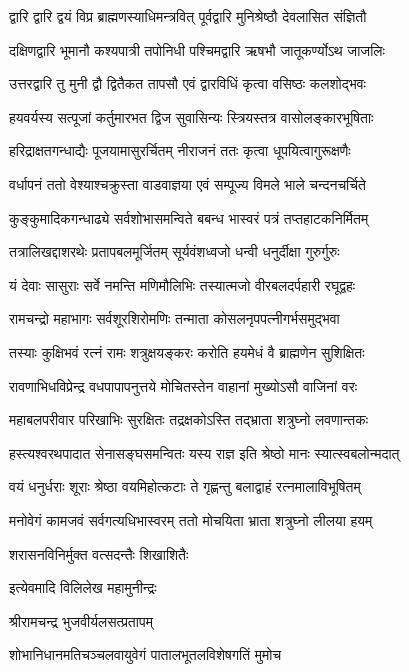 \twolineshloka
{द्वारि द्वारि द्वयं विप्र ब्राह्मणस्याधिमन्त्रवित्}
{पूर्वद्वारि मुनिश्रेष्ठौ देवलासित संज्ञितौ}%

\twolineshloka
{दक्षिणद्वारि भूमानौ कश्यपात्री तपोनिधी}
{पश्चिमद्वारि ऋषभौ जातूकर्ण्योऽथ जाजलिः}%

\twolineshloka
{उत्तरद्वारि तु मुनी द्वौ द्वितैकत तापसौ}
{एवं द्वारविधिं कृत्वा वसिष्ठः कलशोद्भवः}%

\twolineshloka
{हयवर्यस्य सत्पूजां कर्तुमारभत द्विज}
{सुवासिन्यः स्त्रियस्तत्र वासोलङ्कारभूषिताः}%

\twolineshloka
{हरिद्राक्षतगन्धाद्यैः पूजयामासुरर्चितम्}
{नीराजनं ततः कृत्वा धूपयित्वागुरूक्षणैः}%

\twolineshloka
{वर्धापनं ततो वेश्याश्चक्रुस्ता वाडवाज्ञया}
{एवं सम्पूज्य विमले भाले चन्दनचर्चिते}%

\twolineshloka
{कुङ्कुमादिकगन्धाढ्ये सर्वशोभासमन्विते}
{बबन्ध भास्वरं पत्रं तप्तहाटकनिर्मितम्}%

\twolineshloka
{तत्रालिखद्दाशरथेः प्रतापबलमूर्जितम्}
{सूर्यवंशध्वजो धन्वी धनुर्दीक्षा गुरुर्गुरुः}%

\twolineshloka
{यं देवाः सासुराः सर्वे नमन्ति मणिमौलिभिः}
{तस्यात्मजो वीरबलदर्पहारी रघूद्वहः}%

\twolineshloka
{रामचन्द्रो महाभागः सर्वशूरशिरोमणिः}
{तन्माता कोसलनृपपत्नीगर्भसमुद्भवा}%

\twolineshloka
{तस्याः कुक्षिभवं रत्नं रामः शत्रुक्षयङ्करः}
{करोति हयमेधं वै ब्राह्मणेन सुशिक्षितः}%

\twolineshloka
{रावणाभिधविप्रेन्द्र वधपापापनुत्तये}
{मोचितस्तेन वाहानां मुख्योऽसौ वाजिनां वरः}%

\twolineshloka
{महाबलपरीवार परिखाभिः सुरक्षितः}
{तद्रक्षकोऽस्ति तद्भ्राता शत्रुघ्नो लवणान्तकः}%

\twolineshloka
{हस्त्यश्वरथपादात सेनासङ्घसमन्वितः}
{यस्य राज्ञ इति श्रेष्ठो मानः स्यात्स्वबलोन्मदात्}%

\twolineshloka
{वयं धनुर्धराः शूराः श्रेष्ठा वयमिहोत्कटाः}
{ते गृह्णन्तु बलाद्वाहं रत्नमालाविभूषितम्}%

\twolineshloka
{मनोवेगं कामजवं सर्वगत्यधिभास्वरम्}
{ततो मोचयिता भ्राता शत्रुघ्नो लीलया हयम्}%

\onelineshloka
{शरासनविनिर्मुक्त वत्सदन्तैः शिखाशितैः}%

इत्येवमादि विलिलेख महामुनीन्द्रः

श्रीरामचन्द्र भुजवीर्यलसत्प्रतापम्

\twolineshloka
{शोभानिधानमतिचञ्चलवायुवेगं}
{पातालभूतलविशेषगतिं मुमोच}%

